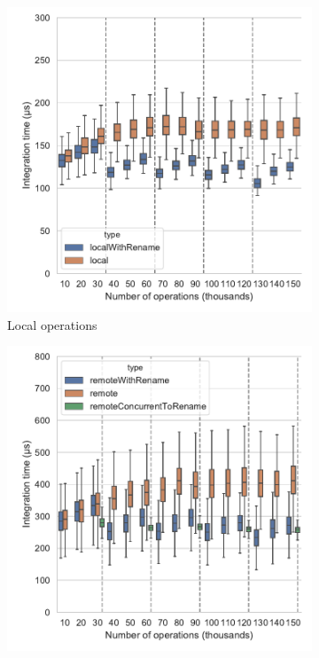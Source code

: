 \documentclass[sigplan,10pt]{acmart}
\begin{document}
\begin{figure}
    \centering
    \begin{subfigure}{0.35\textwidth}
        \includegraphics[width=1\textwidth]{img/integration-time-boxplot-local-operations-without-outliers.pdf}
        \caption{Local operations}
        \label{fig:evolution-integration-time-local-insert-remove}
    \end{subfigure}
    \begin{subfigure}{0.35\textwidth}
        \includegraphics[width=1\textwidth]{img/integration-time-boxplot-remote-operations-without-outliers.pdf}

\end{subfigure}
\end{figure}
\end{document}
